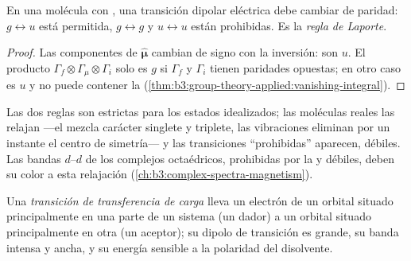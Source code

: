 \begin{theorem}\label{thm:b3:electronic-spectroscopy:laporte}
En una molécula con , una transición dipolar eléctrica debe
cambiar de paridad: $g \leftrightarrow u$ está permitida, $g \leftrightarrow g$ y $u
\leftrightarrow u$ están prohibidas. Es la \emph{regla de Laporte}.
\end{theorem}

\begin{proof}
Las componentes de $\hat{\boldsymbol\mu}$ cambian de signo con la inversión: son $u$.
El producto $\Gamma_f\otimes\Gamma_\mu\otimes\Gamma_i$ solo es $g$ si $\Gamma_f$ y $\Gamma_i$
tienen paridades opuestas; en otro caso es $u$ y no puede contener la  (\cref{thm:b3:group-theory-applied:vanishing-integral}).
\end{proof}

Las dos reglas son estrictas para los estados idealizados; las moléculas reales las relajan
---el  mezcla carácter singlete y triplete, las vibraciones
eliminan por un instante el centro de simetría--- y las transiciones ``prohibidas''
aparecen, débiles. Las bandas $d$--$d$ de los complejos octaédricos, prohibidas por la  y débiles, deben su color a esta relajación
(\cref{ch:b3:complex-spectra-magnetism}).

\begin{definition}\label{def:b3:electronic-spectroscopy:charge-transfer}
Una \emph{transición de transferencia de carga} lleva un
electrón de un orbital situado principalmente en una parte de un sistema (un dador) a
un orbital situado principalmente en otra (un aceptor); su dipolo de transición es
grande, su banda intensa y ancha, y su energía sensible a la polaridad del
disolvente.
\end{definition}

